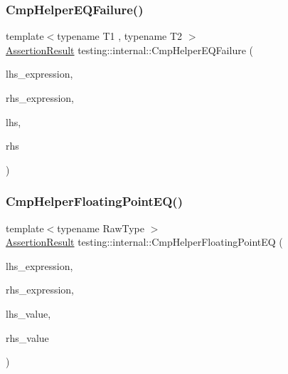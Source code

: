 \subsubsection{\texorpdfstring{Cmp\+Helper\+E\+Q\+Failure()}{CmpHelperEQFailure()}}
{\footnotesize\ttfamily template$<$typename T1 , typename T2 $>$ \\
\hyperlink{classtesting_1_1_assertion_result}{Assertion\+Result} testing\+::internal\+::\+Cmp\+Helper\+E\+Q\+Failure (\begin{DoxyParamCaption}\item[{const char $\ast$}]{lhs\+\_\+expression,  }\item[{const char $\ast$}]{rhs\+\_\+expression,  }\item[{const T1 \&}]{lhs,  }\item[{const T2 \&}]{rhs }\end{DoxyParamCaption})}

\mbox{\label{namespacetesting_1_1internal_a98ce463e5dbe0c6120fa817e1f8f2944}} 
\subsubsection{\texorpdfstring{Cmp\+Helper\+Floating\+Point\+E\+Q()}{CmpHelperFloatingPointEQ()}}
{\footnotesize\ttfamily template$<$typename Raw\+Type $>$ \\
\hyperlink{classtesting_1_1_assertion_result}{Assertion\+Result} testing\+::internal\+::\+Cmp\+Helper\+Floating\+Point\+EQ (\begin{DoxyParamCaption}\item[{const char $\ast$}]{lhs\+\_\+expression,  }\item[{const char $\ast$}]{rhs\+\_\+expression,  }\item[{Raw\+Type}]{lhs\+\_\+value,  }\item[{Raw\+Type}]{rhs\+\_\+value }\end{DoxyParamCaption})}

\mbox{\label{namespacetesting_1_1internal_a894ffccd936d78fd555f490020c27f0a}} 
